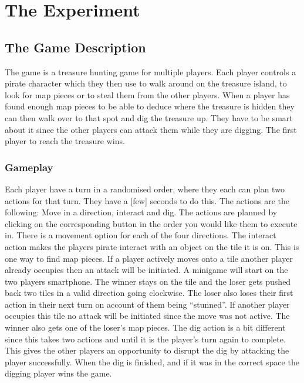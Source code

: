 \chapter{The Experiment}\label{ch:experiment}
\section{The Game Description}
The game is a treasure hunting game for multiple players. Each player controls a pirate character which they then use to walk around on the treasure island, to look for map pieces or to steal them from the other players. When a player has found enough map pieces to be able to deduce where the treasure is hidden they can then walk over to that spot and dig the treasure up. They have to be smart about it since the other players can attack them while they are digging. The first player to reach the treasure wins. 


\subsection{Gameplay}
Each player have a turn in a randomised order, where they each can plan two actions for that turn. They have a [few] seconds to do this. The actions are the following: Move in a direction, interact and dig. The actions are planned by clicking on the corresponding button in the order you would like them to execute in. There is a movement option for each of the four directions. The interact action makes the players pirate interact with an object on the tile it is on. This is one way to find map pieces. If a player actively moves onto a tile another player already occupies then an attack will be initiated. A minigame will start on the two players smartphone. The winner stays on the tile and the loser gets pushed back two tiles in a valid direction going clockwise. The loser also loses their first action in their next turn on account of them being “stunned”. If another player occupies this tile no attack will be initiated since the move was not active. The winner also gets one of the loser’s map pieces. The dig action is a bit different since this takes two actions and until it is the player’s turn again to complete. This gives the other players an opportunity to disrupt the dig by attacking the player successfully. When the dig is finished, and if it was in the correct space the digging player wins the game. 


